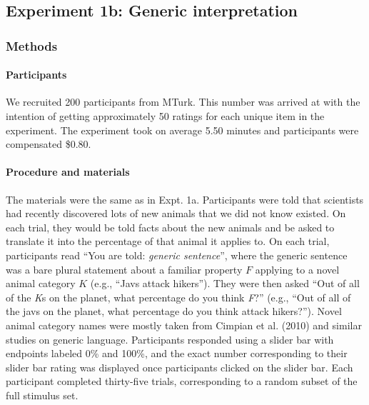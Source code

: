 \documentclass[floatsintext,doc]{apa6}
\let\oldparagraph\paragraph
\renewcommand{\paragraph}[1]{\oldparagraph{#1}\mbox{}}
\begin{document}
\hypertarget{experiment-1b-generic-interpretation}{%
\subsection{Experiment 1b: Generic interpretation}\label{experiment-1b-generic-interpretation}}

\hypertarget{methods-1}{%
\subsubsection{Methods}\label{methods-1}}

\hypertarget{participants-2}{%
\paragraph{Participants}\label{participants-2}}

We recruited 200 participants from MTurk.
This number was arrived at with the intention of getting approximately 50 ratings for each unique item in the experiment.
The experiment took on average 5.50 minutes and participants were compensated \$0.80.

\hypertarget{procedure-and-materials-2}{%
\paragraph{Procedure and materials}\label{procedure-and-materials-2}}

The materials were the same as in Expt. 1a.
Participants were told that scientists had recently discovered lots of new animals that we did not know existed.
On each trial, they would be told facts about the new animals and be asked to translate it into the percentage of that animal it applies to.
On each trial, participants read \enquote{You are told: \emph{generic sentence}}, where the generic sentence was a bare plural statement about a familiar property \(F\) applying to a novel animal category \(K\) (e.g., \enquote{Javs attack hikers}).
They were then asked \enquote{Out of all of the \emph{K}s on the planet, what percentage do you think \emph{F}?} (e.g., \enquote{Out of all of the javs on the planet, what percentage do you think attack hikers?}).
Novel animal category names were mostly taken from Cimpian et al. (2010) and similar studies on generic language.
Participants responded using a slider bar with endpoints labeled 0\% and 100\%, and the exact number corresponding to their slider bar rating was displayed once participants clicked on the slider bar.
Each participant completed thirty-five trials, corresponding to a random subset of the full stimulus set.
\end{document}
